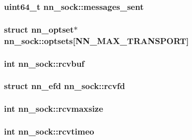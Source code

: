 \subsubsection[{messages\+\_\+sent}]{\setlength{\rightskip}{0pt plus 5cm}uint64\+\_\+t nn\+\_\+sock\+::messages\+\_\+sent}\hypertarget{structnn__sock_a417a8cd7dc4c2814d26f8503ee0bac96}{}\label{structnn__sock_a417a8cd7dc4c2814d26f8503ee0bac96}
\subsubsection[{optsets}]{\setlength{\rightskip}{0pt plus 5cm}struct {\bf nn\+\_\+optset}$\ast$ nn\+\_\+sock\+::optsets\mbox{[}{\bf N\+N\+\_\+\+M\+A\+X\+\_\+\+T\+R\+A\+N\+S\+P\+O\+RT}\mbox{]}}\hypertarget{structnn__sock_af9331237e898452f3525324d5f9a376c}{}\label{structnn__sock_af9331237e898452f3525324d5f9a376c}
\subsubsection[{rcvbuf}]{\setlength{\rightskip}{0pt plus 5cm}int nn\+\_\+sock\+::rcvbuf}\hypertarget{structnn__sock_a1864e5e6fa7ee8a5315dd56d3637a002}{}\label{structnn__sock_a1864e5e6fa7ee8a5315dd56d3637a002}
\subsubsection[{rcvfd}]{\setlength{\rightskip}{0pt plus 5cm}struct {\bf nn\+\_\+efd} nn\+\_\+sock\+::rcvfd}\hypertarget{structnn__sock_a9fb47bafd675b79dd39e99a19e1adb53}{}\label{structnn__sock_a9fb47bafd675b79dd39e99a19e1adb53}
\subsubsection[{rcvmaxsize}]{\setlength{\rightskip}{0pt plus 5cm}int nn\+\_\+sock\+::rcvmaxsize}\hypertarget{structnn__sock_ab9c1d5c09c74c1f1228f643bc87f0187}{}\label{structnn__sock_ab9c1d5c09c74c1f1228f643bc87f0187}
\subsubsection[{rcvtimeo}]{\setlength{\rightskip}{0pt plus 5cm}int nn\+\_\+sock\+::rcvtimeo}\hypertarget{structnn__sock_ad118169c7decab1c9ecb75c07a6d104b}{}\label{structnn__sock_ad118169c7decab1c9ecb75c07a6d104b}
